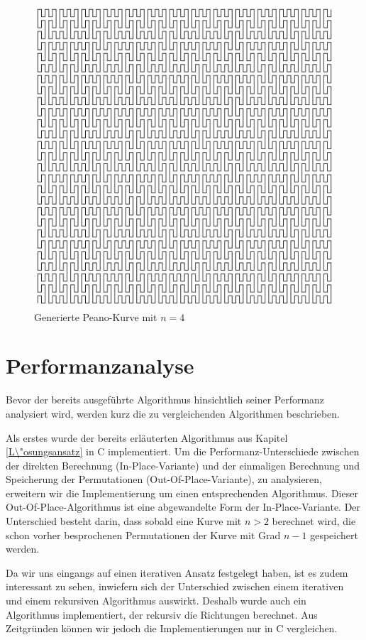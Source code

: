 \documentclass[course=asp]{aspdoc}
\begin{document}
\begin{figure}[ht]
\centering
\includegraphics[scale = 0.2]{peanoGrad4.png}
\caption{Generierte Peano-Kurve mit $n = 4$}\label{Abb:Generierte Kurve Grad 4}
\end{figure}

\section{Performanzanalyse} \label{Performanzanalyse}
Bevor der bereits ausgef\"uhrte Algorithmus hinsichtlich seiner Performanz analysiert wird, werden kurz die zu vergleichenden Algorithmen beschrieben.

Als erstes wurde der bereits erl\"auterten Algorithmus aus Kapitel \ref{L\"osungsansatz} in C implementiert. Um die Performanz-Unterschiede zwischen der direkten Berechnung (In-Place-Variante) und der einmaligen Berechnung und Speicherung der Permutationen (Out-Of-Place-Variante), zu analysieren, erweitern wir die Implementierung um einen entsprechenden Algorithmus. Dieser Out-Of-Place-Algorithmus ist eine abgewandelte Form der In-Place-Variante. Der Unterschied besteht darin, dass sobald eine Kurve mit $n > 2$ berechnet wird, die schon vorher besprochenen Permutationen der Kurve mit Grad $n - 1$ gespeichert werden. 

Da wir uns eingangs auf einen iterativen Ansatz festgelegt haben, ist es zudem interessant zu sehen, inwiefern sich der Unterschied zwischen einem iterativen und einem rekursiven Algorithmus auswirkt. Deshalb wurde auch ein Algorithmus implementiert, der rekursiv die Richtungen berechnet. Aus Zeitgr\"unden k\"onnen wir jedoch die Implementierungen nur in C vergleichen. 
\end{document}
